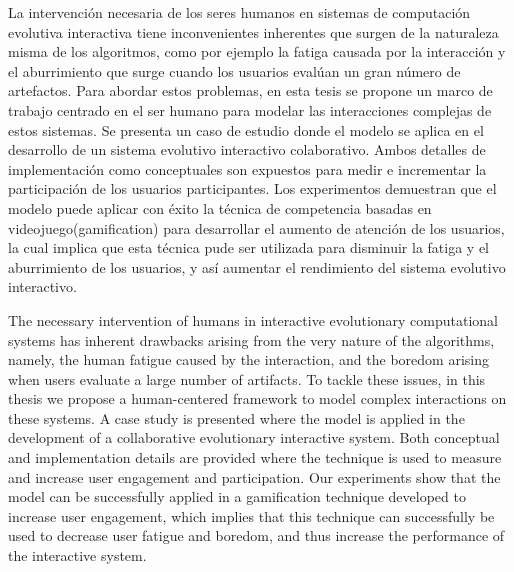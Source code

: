 


La intervenci\'on necesaria de los seres humanos en sistemas de computaci\'on
evolutiva interactiva tiene inconvenientes inherentes que surgen de la
naturaleza misma de los algoritmos, como por ejemplo la fatiga causada por la
interacci\'on y el aburrimiento que surge cuando los usuarios eval\'uan un gran
n\'umero de artefactos. Para abordar estos problemas, en esta tesis se propone
un marco de trabajo centrado en el ser humano para
modelar las interacciones complejas de estos sistemas. Se presenta un caso de
estudio donde el modelo se aplica en el desarrollo de un sistema evolutivo
interactivo colaborativo. Ambos detalles de implementaci\'on como conceptuales
son expuestos para medir e incrementar la participaci\'on de los usuarios
participantes. Los experimentos demuestran que el modelo puede aplicar con
\'exito la t\'ecnica de competencia basadas en videojuego(gamification) para
desarrollar el aumento de atenci\'on de los usuarios, la cual implica que esta
t\'ecnica pude ser utilizada para disminuir la fatiga y el aburrimiento de los
usuarios, y as\'i aumentar el rendimiento del sistema evolutivo interactivo.





The necessary intervention of humans in interactive evolutionary computational
systems has inherent drawbacks arising from the very nature of the algorithms,
namely, the human fatigue caused by the interaction, and the boredom arising
when users evaluate a large number of artifacts. To tackle these issues, in this
thesis we propose a human-centered framework to model complex interactions on
these systems. A case study is presented where the model is applied in the
development of a collaborative evolutionary interactive system. Both conceptual
and implementation details are provided where the technique is used to measure
and increase user engagement and participation. Our experiments show that the
model can be successfully applied in a gamification technique developed to
increase user engagement, which implies that this technique can successfully be
used to decrease user fatigue and boredom, and thus increase the performance of
the interactive system.
